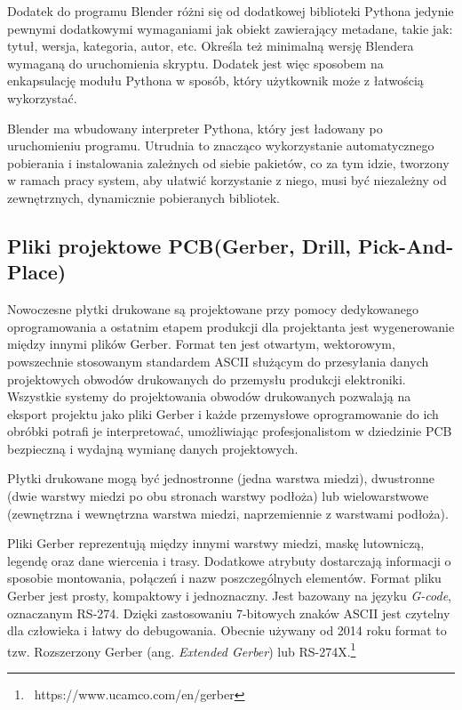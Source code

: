 \documentclass[brudnopis]{xmgr}
\begin{document}
Dodatek do programu Blender różni się od dodatkowej biblioteki Pythona jedynie pewnymi dodatkowymi wymaganiami jak obiekt zawierający metadane, takie jak: tytuł, wersja, kategoria, autor, etc. Określa też minimalną wersję Blendera wymaganą do uruchomienia skryptu. Dodatek jest więc sposobem na enkapsulację modułu Pythona w sposób, który użytkownik może z łatwością wykorzystać.

Blender ma wbudowany interpreter Pythona, który jest ładowany po uruchomieniu programu. Utrudnia to znacząco wykorzystanie automatycznego pobierania i instalowania zależnych od siebie pakietów, co za tym idzie, tworzony w ramach pracy system, aby ułatwić korzystanie z niego, musi być niezależny od zewnętrznych, dynamicznie pobieranych bibliotek.


\subsection{Pliki projektowe PCB\newline(Gerber, Drill, Pick-And-Place)}

Nowoczesne płytki drukowane są projektowane przy pomocy dedykowanego oprogramowania a ostatnim etapem produkcji dla projektanta jest wygenerowanie między innymi plików Gerber.\cite{Khandpur}
Format ten jest otwartym, wektorowym, powszechnie stosowanym standardem ASCII służącym do przesyłania danych projektowych obwodów drukowanych do przemysłu produkcji elektroniki. Wszystkie systemy do projektowania obwodów drukowanych pozwalają na eksport projektu jako pliki Gerber i każde przemysłowe oprogramowanie do ich obróbki potrafi je interpretować, umożliwiając profesjonalistom w dziedzinie PCB bezpieczną i wydajną wymianę danych projektowych.\cite{Williams}

Płytki drukowane mogą być jednostronne (jedna warstwa miedzi), dwustronne (dwie warstwy miedzi po obu stronach warstwy podłoża) lub wielowarstwowe (zewnętrzna i wewnętrzna warstwa miedzi, naprzemiennie z warstwami podłoża).\cite{schroeder}

Pliki Gerber reprezentują między innymi warstwy miedzi, maskę lutowniczą, legendę oraz dane wiercenia i trasy. Dodatkowe atrybuty dostarczają informacji o sposobie montowania, połączeń i nazw poszczególnych elementów. Format pliku Gerber jest prosty, kompaktowy i jednoznaczny. Jest bazowany na języku \emph{G-code}, oznaczanym RS-274. Dzięki zastosowaniu 7-bitowych znaków ASCII jest czytelny dla człowieka i łatwy do debugowania. Obecnie używany od 2014 roku format to tzw. Rozszerzony Gerber (ang. \emph{Extended Gerber}) lub RS-274X.\footnote{~https://www.ucamco.com/en/gerber}
\end{document}
